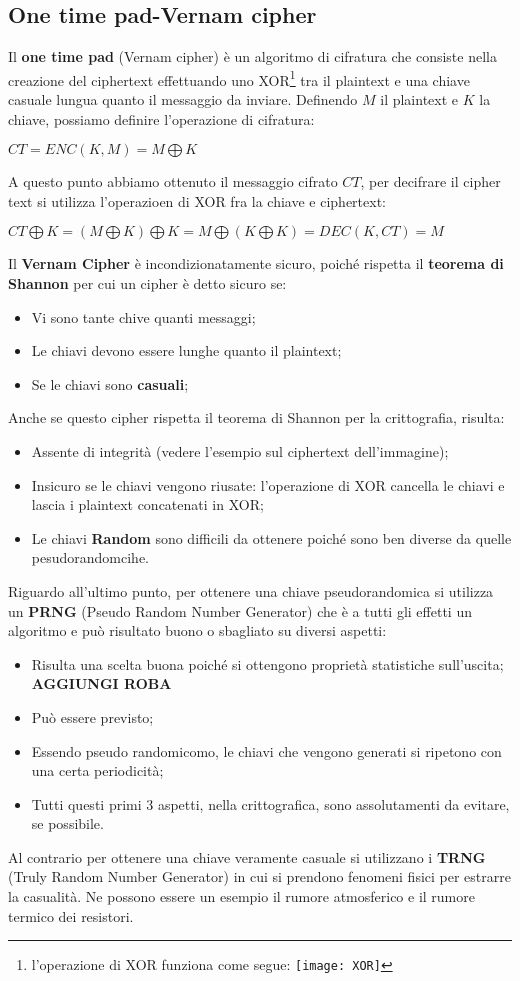 \documentclass{article}
\theoremstyle{remark}
\begin{document}
\subsection{One time pad-Vernam cipher}
Il \textbf{one time pad} (Vernam cipher) è un algoritmo di cifratura che consiste nella creazione del ciphertext effettuando uno XOR\footnote{l'operazione di XOR funziona come segue: \texttt{[image: XOR]}
} tra il plaintext e una chiave casuale lungua quanto il messaggio da inviare. Definendo \(M\) il plaintext e \(K\) la chiave, possiamo definire l'operazione di cifratura:
\begin{center}
	\(CT=ENC(K,M)=M\bigoplus K\)
\end{center}
A questo punto abbiamo ottenuto il messaggio cifrato \(CT\), per decifrare il cipher text si utilizza l'operazioen di XOR fra la chiave e ciphertext:
\begin{center}
	\(CT\bigoplus K=(M\bigoplus K)\bigoplus K=M\bigoplus (K\bigoplus K)=DEC(K,CT)=M\)
\end{center}
Il \textbf{ Vernam Cipher} è incondizionatamente sicuro, poiché rispetta il \textbf{teorema di Shannon} per cui un cipher è detto sicuro se:
\begin{itemize}
	\item Vi sono tante chive quanti messaggi;
	\item Le chiavi devono essere lunghe quanto il plaintext;
	\item Se le chiavi sono \textbf{casuali};
\end{itemize}
Anche se questo cipher rispetta il teorema di Shannon per la crittografia, risulta:
\begin{itemize}
	\item Assente di integrità (vedere l'esempio sul ciphertext dell'immagine);
	\item Insicuro se le chiavi vengono riusate: l'operazione di XOR cancella le chiavi e lascia i plaintext concatenati in XOR\@;
	\item Le chiavi \textbf{Random} sono difficili da ottenere poiché sono ben diverse da quelle pesudorandomcihe.
\end{itemize}
Riguardo all'ultimo punto, per ottenere una chiave pseudorandomica si utilizza un \textbf{PRNG} (Pseudo Random Number Generator) che è a tutti gli effetti un algoritmo e può risultato buono o sbagliato su diversi aspetti:
\begin{itemize}
	\item Risulta una scelta buona poiché si ottengono proprietà statistiche sull'uscita;\newline
	      \textbf{AGGIUNGI ROBA}
	\item Può essere previsto;
	\item Essendo pseudo randomicomo, le chiavi che vengono generati si ripetono con una certa periodicità;
	\item Tutti questi primi 3 aspetti, nella crittografica, sono assolutamenti da evitare, se possibile.
\end{itemize}
Al contrario per ottenere una chiave veramente casuale si utilizzano i \textbf{TRNG} (Truly Random Number Generator) in cui si prendono fenomeni fisici per estrarre la casualità. Ne possono essere un esempio il rumore atmosferico e il rumore termico dei resistori.
\end{document}

